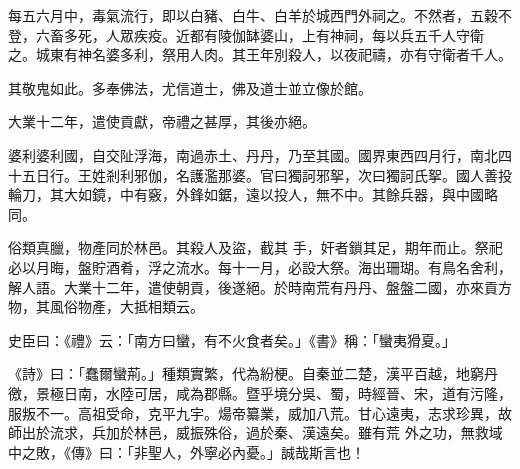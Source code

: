 \begin{pinyinscope}
 每五六月中，毒氣流行，即以白豬、白牛、白羊於城西門外祠之。不然者，五穀不登，六畜多死，人眾疾疫。近都有陵伽缽婆山，上有神祠，每以兵五千人守衛
 之。城東有神名婆多利，祭用人肉。其王年別殺人，以夜祀禱，亦有守衛者千人。



 其敬鬼如此。多奉佛法，尤信道士，佛及道士並立像於館。



 大業十二年，遣使貢獻，帝禮之甚厚，其後亦絕。



 婆利婆利國，自交阯浮海，南過赤土、丹丹，乃至其國。國界東西四月行，南北四十五日行。王姓剎利邪伽，名護濫那婆。官曰獨訶邪挐，次曰獨訶氏挐。國人善投輪刀，其大如鏡，中有竅，外鋒如鋸，遠以投人，無不中。其餘兵器，與中國略同。



 俗類真臘，物產同於林邑。其殺人及盜，截其
 手，奸者鎖其足，期年而止。祭祀必以月晦，盤貯酒肴，浮之流水。每十一月，必設大祭。海出珊瑚。有鳥名舍利，解人語。大業十二年，遣使朝貢，後遂絕。於時南荒有丹丹、盤盤二國，亦來貢方物，其風俗物產，大抵相類云。



 史臣曰：《禮》云：「南方曰蠻，有不火食者矣。」《書》稱：「蠻夷猾夏。」



 《詩》曰：「蠢爾蠻荊。」種類實繁，代為紛梗。自秦並二楚，漢平百越，地窮丹徼，景極日南，水陸可居，咸為郡縣。暨乎境分吳、蜀，時經晉、宋，道有污隆，服叛不一。高祖受命，克平九宇。煬帝纂業，威加八荒。甘心遠夷，志求珍異，故師出於流求，兵加於林邑，威振殊俗，過於秦、漢遠矣。雖有荒
 外之功，無救域中之敗，《傳》曰：「非聖人，外寧必內憂。」誠哉斯言也！



\end{pinyinscope}